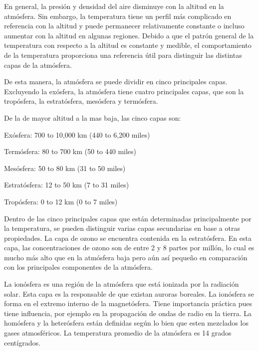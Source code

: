 \documentclass{article} %
\begin{document}
En general, la presión y densidad del aire disminuye con la altitud en la atmósfera. Sin embargo, la temperatura tiene un perfil más complicado en referencia con la altitud y puede permanecer relativamente constante o incluso aumentar con la altitud en algunas regiones. Debido a que el patrón general de la temperatura con respecto a la altitud es constante y medible, el comportamiento de la temperatura proporciona una referencia útil para distinguir las distintas capas de la atmósfera. 
\vspace{0.5 cm}

	De esta manera, la atmósfera se puede dividir en cinco principales capas. Excluyendo la exósfera, la atmósfera tiene cuatro principales capas, que son la tropósfera, la estratósfera, mesósfera y termósfera. 
\vspace{0.5 cm}

	De la de mayor altitud a la mas baja, las cinco capas son:
\vspace{0.5 cm}

    Exósfera: 700 to 10,000 km (440 to 6,200 miles)
\vspace{0.5 cm}

    Termósfera: 80 to 700 km (50 to 440 miles)
\vspace{0.5 cm}

    Mesósfera: 50 to 80 km (31 to 50 miles)
\vspace{0.5 cm}

    Estratósfera: 12 to 50 km (7 to 31 miles)
\vspace{0.5 cm}

    Tropósfera: 0 to 12 km (0 to 7 miles)
\vspace{0.5 cm}

	Dentro de las cinco principales capas que están determinadas principalmente por la temperatura, se pueden distinguir varias capas secundarias en base a otras propiedades. La capa de ozono se encuentra contenida en la estratósfera. En esta capa, las concentraciones de ozono son de entre 2 y 8 partes por millón, lo cual es mucho más alto que en la atmósfera baja pero aún así pequeño en comparación con los principales componentes de la atmósfera. 
\vspace{0.5 cm}

    La ionósfera es una región de la atmósfera que está ionizada por la radiación solar. Esta capa es la responsable de que existan auroras boreales. La ionósfera se forma en el extremo interno de la magnetósfera. Tiene importancia práctica pues tiene influencia, por ejemplo en la propagación de ondas de radio en la tierra. La homósfera y la heterósfera están definidas según lo bien que esten mezclados los gases atmosféricos. La temperatura promedio de la atmósfera es 14 grados centígrados.
\end{document}
